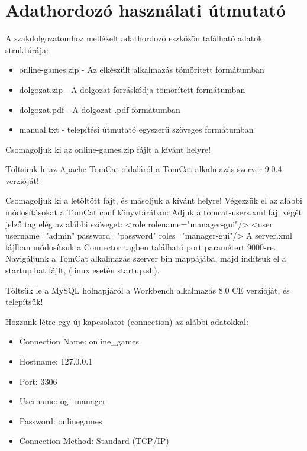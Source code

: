 \chapter*{Adathordozó használati útmutató}


\noindent A szakdolgozatomhoz mellékelt adathordozó eszközön található adatok struktúrája:

\begin{itemize}
	\item online-games.zip - Az elkészült alkalmazás tömörített formátumban
	\item dolgozat.zip - A dolgozat forráskódja tömörített formátumban
	\item dolgozat.pdf - A dolgozat .pdf formátumban
	\item manual.txt - telepítési útmutató egyszerű szöveges formátumban
\end{itemize}

Csomagoljuk ki az online-games.zip fájlt a kívánt helyre! \newline

Töltsünk le az Apache TomCat oldaláról a TomCat alkalmazás szerver 9.0.4 verzióját!

Csomagoljuk ki a letöltött fájt, és másoljuk a kívánt helyre!
Végezzük el az alábbi módosításokat a TomCat conf könyvtárában:
Adjuk a tomcat-users.xml fájl végét jelző tag elég az alábbi szöveget:
<role rolename="manager-gui"/>
<user username="admin" password="password" roles="manager-gui"/>
A server.xml fájlban módosítsuk a Connector tagben található port paramétert 9000-re.
Navigáljunk a TomCat alkalmazás szerver bin mappájába, majd indítsuk el a startup.bat fájlt, (linux esetén startup.sh). \newline

Töltsük le a MySQL holnapjáról a Workbench alkalmazás 8.0 CE verzióját, és telepítsük!

Hozzunk létre egy új kapcsolatot (connection) az alábbi adatokkal:

\begin{itemize}
	\item Connection Name: online\_games
	\item Hostname: 127.0.0.1
	\item Port: 3306
	\item Username: og\_manager
	\item Password: onlinegames
	\item Connection Method: Standard (TCP/IP)
\end{itemize}

